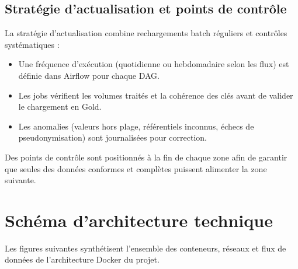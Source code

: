 \documentclass[12pt, a4paper]{report}
\begin{document}
\subsection{Stratégie d'actualisation et points de contrôle}

La stratégie d'actualisation combine rechargements batch réguliers et contrôles systématiques :

\begin{itemize}[label=\textcolor{chuBlue}{\textbullet}]
  \item Une fréquence d'exécution (quotidienne ou hebdomadaire selon les flux) est définie dans Airflow pour chaque DAG.
  \item Les jobs vérifient les volumes traités et la cohérence des clés avant de valider le chargement en Gold.
  \item Les anomalies (valeurs hors plage, référentiels inconnus, échecs de pseudonymisation) sont journalisées pour correction.
\end{itemize}

Des points de contrôle sont positionnés à la fin de chaque zone afin de garantir que seules des données conformes et complètes puissent alimenter la zone suivante.

\section{Schéma d'architecture technique}

Les figures suivantes synthétisent l'ensemble des conteneurs, réseaux et flux de données de l'architecture Docker du projet.
\end{document}
